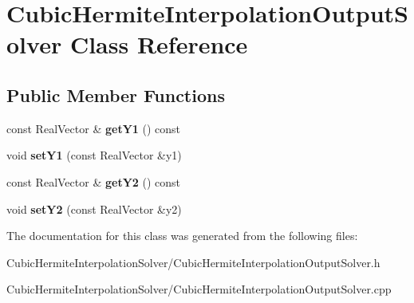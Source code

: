 \hypertarget{classCubicHermiteInterpolationOutputSolver}{
\section{CubicHermiteInterpolationOutputSolver Class Reference}
\label{classCubicHermiteInterpolationOutputSolver}
}
\subsection*{Public Member Functions}
\begin{DoxyCompactItemize}
\item 
\hypertarget{classCubicHermiteInterpolationOutputSolver_a42c91965adfa2f4b0c73068ad8791b39}{
const RealVector \& {\bfseries getY1} () const }
\label{classCubicHermiteInterpolationOutputSolver_a42c91965adfa2f4b0c73068ad8791b39}

\item 
\hypertarget{classCubicHermiteInterpolationOutputSolver_a56ad7fc8d6c8a5dc03b811b49b6b6504}{
void {\bfseries setY1} (const RealVector \&y1)}
\label{classCubicHermiteInterpolationOutputSolver_a56ad7fc8d6c8a5dc03b811b49b6b6504}

\item 
\hypertarget{classCubicHermiteInterpolationOutputSolver_a526058d3324bd6930154d1d3954aa832}{
const RealVector \& {\bfseries getY2} () const }
\label{classCubicHermiteInterpolationOutputSolver_a526058d3324bd6930154d1d3954aa832}

\item 
\hypertarget{classCubicHermiteInterpolationOutputSolver_a2ad18acaef9b4c114bb0667653fd5132}{
void {\bfseries setY2} (const RealVector \&y2)}
\label{classCubicHermiteInterpolationOutputSolver_a2ad18acaef9b4c114bb0667653fd5132}

\end{DoxyCompactItemize}


The documentation for this class was generated from the following files:\begin{DoxyCompactItemize}
\item 
CubicHermiteInterpolationSolver/CubicHermiteInterpolationOutputSolver.h\item 
CubicHermiteInterpolationSolver/CubicHermiteInterpolationOutputSolver.cpp\end{DoxyCompactItemize}
